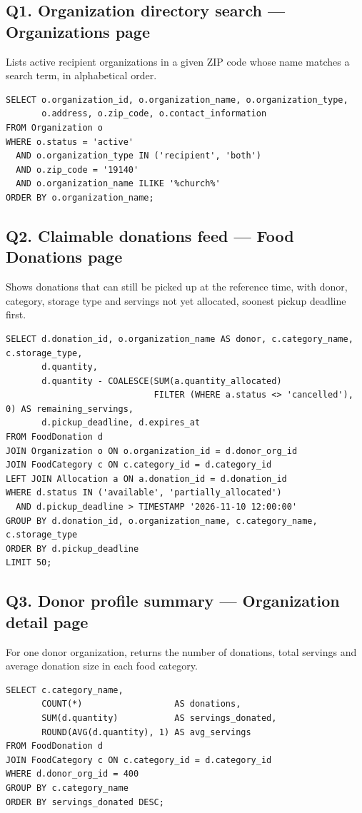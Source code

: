 \documentclass[11pt,letterpaper]{article}
\begin{document}
\subsection*{Q1. Organization directory search --- Organizations page}
Lists active recipient organizations in a given ZIP code whose name matches a search term, in alphabetical order.

\begin{lstlisting}
SELECT o.organization_id, o.organization_name, o.organization_type,
       o.address, o.zip_code, o.contact_information
FROM Organization o
WHERE o.status = 'active'
  AND o.organization_type IN ('recipient', 'both')
  AND o.zip_code = '19140'
  AND o.organization_name ILIKE '%church%'
ORDER BY o.organization_name;
\end{lstlisting}

\subsection*{Q2. Claimable donations feed --- Food Donations page}
Shows donations that can still be picked up at the reference time, with donor, category, storage type and servings not yet allocated, soonest pickup deadline first.

\begin{lstlisting}
SELECT d.donation_id, o.organization_name AS donor, c.category_name, c.storage_type,
       d.quantity,
       d.quantity - COALESCE(SUM(a.quantity_allocated)
                             FILTER (WHERE a.status <> 'cancelled'), 0) AS remaining_servings,
       d.pickup_deadline, d.expires_at
FROM FoodDonation d
JOIN Organization o ON o.organization_id = d.donor_org_id
JOIN FoodCategory c ON c.category_id = d.category_id
LEFT JOIN Allocation a ON a.donation_id = d.donation_id
WHERE d.status IN ('available', 'partially_allocated')
  AND d.pickup_deadline > TIMESTAMP '2026-11-10 12:00:00'
GROUP BY d.donation_id, o.organization_name, c.category_name, c.storage_type
ORDER BY d.pickup_deadline
LIMIT 50;
\end{lstlisting}

\subsection*{Q3. Donor profile summary --- Organization detail page}
For one donor organization, returns the number of donations, total servings and average donation size in each food category.

\begin{lstlisting}
SELECT c.category_name,
       COUNT(*)                  AS donations,
       SUM(d.quantity)           AS servings_donated,
       ROUND(AVG(d.quantity), 1) AS avg_servings
FROM FoodDonation d
JOIN FoodCategory c ON c.category_id = d.category_id
WHERE d.donor_org_id = 400
GROUP BY c.category_name
ORDER BY servings_donated DESC;
\end{lstlisting}
\end{document}
